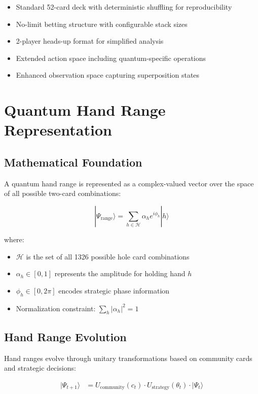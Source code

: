 \documentclass[11pt,a4paper]{article}
\begin{document}
\begin{itemize}
\item Standard 52-card deck with deterministic shuffling for reproducibility
\item No-limit betting structure with configurable stack sizes
\item 2-player heads-up format for simplified analysis
\item Extended action space including quantum-specific operations
\item Enhanced observation space capturing superposition states
\end{itemize}

\section{Quantum Hand Range Representation}

\subsection{Mathematical Foundation}

A quantum hand range is represented as a complex-valued vector over the space of all possible two-card combinations:

\begin{equation}
|\Psi_{\text{range}}\rangle = \sum_{h \in \mathcal{H}} \alpha_h e^{i\phi_h} |h\rangle
\end{equation}

where:
\begin{itemize}
\item $\mathcal{H}$ is the set of all 1326 possible hole card combinations
\item $\alpha_h \in [0,1]$ represents the amplitude for holding hand $h$
\item $\phi_h \in [0, 2\pi]$ encodes strategic phase information
\item Normalization constraint: $\sum_{h} |\alpha_h|^2 = 1$
\end{itemize}

\subsection{Hand Range Evolution}

Hand ranges evolve through unitary transformations based on community cards and strategic decisions:

\begin{align}
|\Psi_{t+1}\rangle &= U_{\text{community}}(c_t) \cdot U_{\text{strategy}}(\theta_t) \cdot |\Psi_t\rangle
\end{align}
\end{document}
